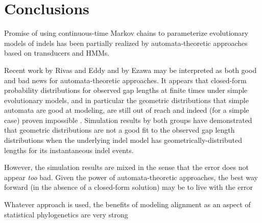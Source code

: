 \documentclass{bmcart}
\begin{document}
\section*{Conclusions}

Promise of using continuous-time Markov chains to parameterize evolutionary models of indels
has been partially realized by automata-theoretic approaches
based on transducers and HMMs.

Recent work by Rivas and Eddy \cite{RivasEddy2015}
and by Ezawa \cite{Ezawa2016a,Ezawa2016b,Ezawa2016bErratum}
may be interpreted as both good and bad news for automata-theoretic approaches.
It appears that closed-form probability distributions for observed gap lengths at finite times
under simple evolutionary models,
and in particular the geometric distributions that simple automata are good at modeling,
are still out of reach and indeed (for a simple case) proven impossible \cite{RivasEddy2015}.
Simulation results by both groups have demonstrated that geometric distributions are not
a good fit to the observed gap length distributions when the underlying indel model
has geometrically-distributed lengths for its instantaneous indel events.

However, the simulation results are mixed in the sense that the error does not appear
{\em too} bad.
Given the power of automata-theoretic approaches, the best way forward
(in the absence of a closed-form solution) may be to live with the error

Whatever approach is used, the benefits of modeling alignment as an aspect of
statistical phylogenetics are very strong



\end{document}
